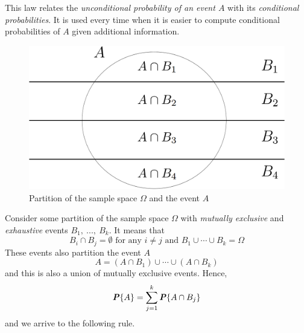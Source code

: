 \documentclass{article}
\begin{document}
This law relates the \textit{unconditional probability of an event $A$} with its \textit{conditional probabilities}. It is used every time when it is easier to compute conditional probabilities of $A$ given additional information.

\begin{figure}[ht!]
    \centering
    \includegraphics[width=.6\textwidth]{img/fig2.6.png}
    \caption{Partition of the sample space $\Omega$ and the event $A$}
\end{figure}

Consider some partition of the sample space $\Omega$ with \textit{mutually exclusive} and \textit{exhaustive} events $B_1,\ ...,\ B_k$. It means that
\begin{equation*}
    B_i \cap B_j = \emptyset \text{ for any } i \neq j \text{ and } B_1 \cup \cdots \cup B_k = \Omega
\end{equation*}
These events also partition the event $A$
\begin{equation*}
    A = (A \cap B_1) \cup \cdots \cup (A \cap B_k)
\end{equation*}
and this is also a union of mutually exclusive events. Hence,
\begin{equation*}
    \textbf{\textit{P}}\{A\} = \sum_{j = 1}^{k} \textbf{\textit{P}}\{A \cap B_j\}
\end{equation*}
and we arrive to the following rule.
\end{document}
